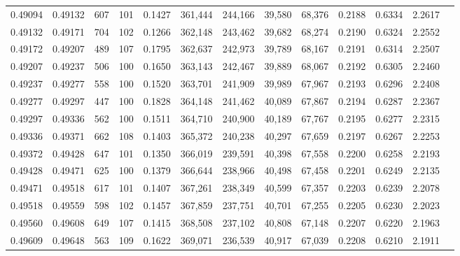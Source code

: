 \begin{tabular}{rrrrrrrrrrrrr}
0.49094 & 0.49132 &   607 & 101 &                                     0.1427 & 361,444 & 244,166 &  39,580 &  68,376 & 0.2188 & 0.6334 & 2.2617 \\
0.49132 & 0.49171 &   704 & 102 &                                     0.1266 & 362,148 & 243,462 &  39,682 &  68,274 & 0.2190 & 0.6324 & 2.2552 \\
0.49172 & 0.49207 &   489 & 107 &                                     0.1795 & 362,637 & 242,973 &  39,789 &  68,167 & 0.2191 & 0.6314 & 2.2507 \\
0.49207 & 0.49237 &   506 & 100 &                                     0.1650 & 363,143 & 242,467 &  39,889 &  68,067 & 0.2192 & 0.6305 & 2.2460 \\
0.49237 & 0.49277 &   558 & 100 &                                     0.1520 & 363,701 & 241,909 &  39,989 &  67,967 & 0.2193 & 0.6296 & 2.2408 \\
0.49277 & 0.49297 &   447 & 100 &                                     0.1828 & 364,148 & 241,462 &  40,089 &  67,867 & 0.2194 & 0.6287 & 2.2367 \\
0.49297 & 0.49336 &   562 & 100 &                                     0.1511 & 364,710 & 240,900 &  40,189 &  67,767 & 0.2195 & 0.6277 & 2.2315 \\
0.49336 & 0.49371 &   662 & 108 &                                     0.1403 & 365,372 & 240,238 &  40,297 &  67,659 & 0.2197 & 0.6267 & 2.2253 \\
0.49372 & 0.49428 &   647 & 101 &                                     0.1350 & 366,019 & 239,591 &  40,398 &  67,558 & 0.2200 & 0.6258 & 2.2193 \\
0.49428 & 0.49471 &   625 & 100 &                                     0.1379 & 366,644 & 238,966 &  40,498 &  67,458 & 0.2201 & 0.6249 & 2.2135 \\
0.49471 & 0.49518 &   617 & 101 &                                     0.1407 & 367,261 & 238,349 &  40,599 &  67,357 & 0.2203 & 0.6239 & 2.2078 \\
0.49518 & 0.49559 &   598 & 102 &                                     0.1457 & 367,859 & 237,751 &  40,701 &  67,255 & 0.2205 & 0.6230 & 2.2023 \\
0.49560 & 0.49608 &   649 & 107 &                                     0.1415 & 368,508 & 237,102 &  40,808 &  67,148 & 0.2207 & 0.6220 & 2.1963 \\
0.49609 & 0.49648 &   563 & 109 &                                     0.1622 & 369,071 & 236,539 &  40,917 &  67,039 & 0.2208 & 0.6210 & 2.1911 \\

\end{tabular}
